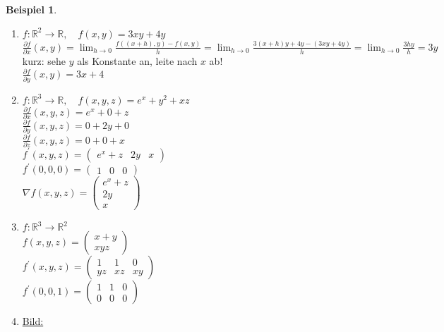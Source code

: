 \documentclass[a4paper,11pt]{article}
\newtheorem{bsp}[definition]{Beispiel}
\begin{document}
\begin{bsp}
\end{bsp}
\begin{enumerate}[label=\alph*)]
	\item $f\colon\mathbb{R}^2\to\mathbb{R},\quad f(x,y)=3xy+4y$ \\
	$\frac{\partial f}{\partial x}(x,y)=\lim_{h\to0}\frac{f((x+h),y)-f(x,y)}{h}=\lim_{h\to0}\frac{3(x+h)y+4y-(3xy+4y)}{h}=\lim_{h\to0}\frac{3hy}{h}=3y$ \\
	kurz: sehe $y$ als Konstante an, leite nach $x$ ab! \\
	$\frac{\partial f}{\partial y}(x,y)=3x+4$
	\item $f\colon\mathbb{R}^3\to\mathbb{R},\quad f(x,y,z)=e^x+y^2+xz$ \\
	$\frac{\partial f}{\partial x}(x,y,z)=e^x+0+z$ \\
	$\frac{\partial f}{\partial y}(x,y,z)=0+2y+0$ \\
	$\frac{\partial f}{\partial z}(x,y,z)=0+0+x$ \\
	$f^\prime(x,y,z)=\begin{pmatrix}e^x+z & 2y & x\end{pmatrix}$ \\
	$f^\prime(0,0,0)=\begin{pmatrix}1 & 0 & 0\end{pmatrix}$ \\
	$\nabla f(x,y,z)=\begin{pmatrix}e^x+z \\ 2y \\ x\end{pmatrix}$
	\item $f\colon\mathbb{R}^3\to\mathbb{R}^2$ \\
	$f(x,y,z)=\begin{pmatrix}x+y \\ xyz\end{pmatrix}$ \\
	$f^\prime(x,y,z)=\begin{pmatrix}1 & 1 & 0 \\ yz & xz & xy\end{pmatrix}$ \\
	$f^\prime(0,0,1)=\begin{pmatrix}1 & 1 & 0 \\ 0 & 0 & 0\end{pmatrix}$
	\item \underline{Bild:}
\end{enumerate}
\end{document}
